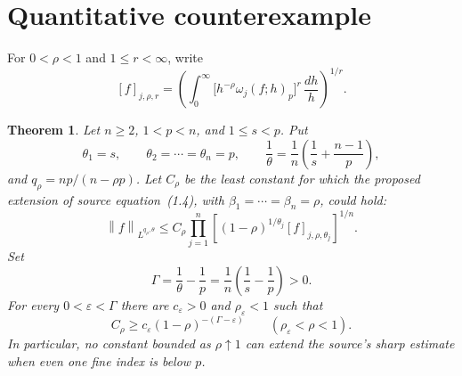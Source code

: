 \documentclass[11pt]{article}
\newtheorem{theorem}{Theorem}
\newcommand{\Nrm}[1]{\left\lVert #1\right\rVert}
\begin{document}
\section*{Quantitative counterexample}

For $0<\rho<1$ and $1\le r<\infty$, write
\[
 [f]_{j,\rho,r}
 =\left(\int_0^\infty
       \big[h^{-\rho}\omega_j(f;h)_p\big]^r\,\frac{dh}{h}
  \right)^{1/r}.
\]

\begin{theorem}\label{thm:counterexample}
Let $n\ge2$, $1<p<n$, and $1\le s<p$.  Put
\[
 \theta_1=s,\qquad \theta_2=\cdots=\theta_n=p,
 \qquad
 \frac1\theta=\frac1n\left(\frac1s+\frac{n-1}{p}\right),
\]
and $q_\rho=np/(n-\rho p)$.  Let $C_\rho$ be the least constant for
which the proposed extension of source equation~(1.4), with
$\beta_1=\cdots=\beta_n=\rho$, could hold:
\begin{equation}\label{eq:proposed}
 \Nrm{f}_{L^{q_\rho,\theta}}
 \le C_\rho
 \prod_{j=1}^n
 \left[(1-\rho)^{1/\theta_j}[f]_{j,\rho,\theta_j}\right]^{1/n}.
\end{equation}
Set
\[
 \Gamma=\frac1\theta-\frac1p
 =\frac1n\left(\frac1s-\frac1p\right)>0.
\]
For every $0<\varepsilon<\Gamma$ there are $c_\varepsilon>0$ and
$\rho_\varepsilon<1$ such that
\[
 C_\rho\ge c_\varepsilon(1-\rho)^{-(\Gamma-\varepsilon)}
 \qquad(\rho_\varepsilon<\rho<1).
\]
In particular, no constant bounded as $\rho\uparrow1$ can extend the source's
sharp estimate when even one fine index is below $p$.
\end{theorem}
\end{document}
